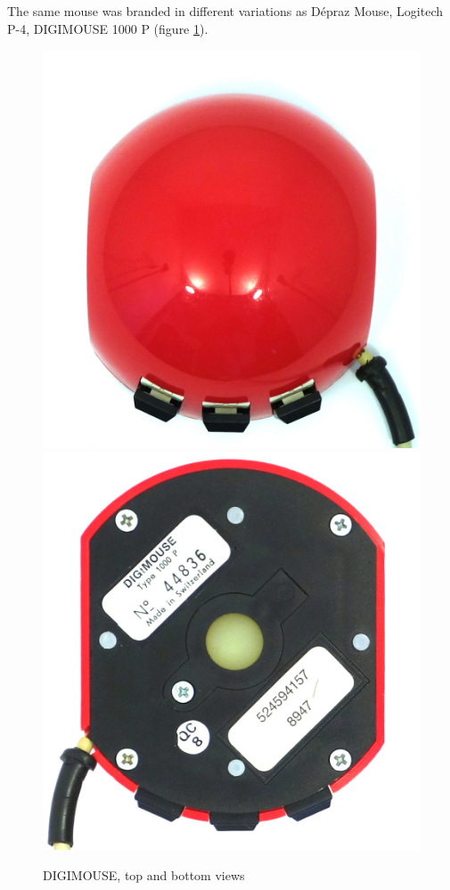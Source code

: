 \documentclass[11pt, a4paper]{article}
\begin{document}
The same mouse was branded in different variations as D\'epraz Mouse, Logitech P-4, DIGIMOUSE 1000 P (figure \ref{fig:DIGIMOUSEP4TopAndBottom}).

\begin{figure}[h]
    \centering
    \includegraphics[scale=0.4]{1982_depraz_digimouse/top_60.jpg}
    \includegraphics[scale=0.37]{1982_depraz_digimouse/bottom_60.jpg}
    \caption{DIGIMOUSE, top and bottom views}
    \label{fig:DIGIMOUSEP4TopAndBottom}
\end{figure}
\end{document}
